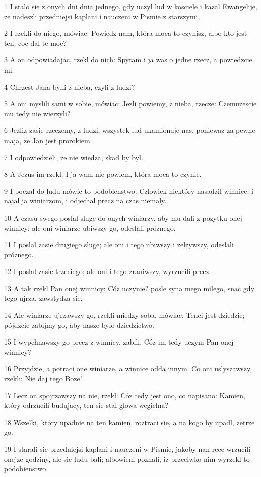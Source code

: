 \par 1 I stalo sie z onych dni dnia jednego, gdy uczyl lud w kosciele i kazal Ewangelije, ze nadeszli przedniejsi kaplani i nauczeni w Pismie z starszymi,
\par 2 I rzekli do niego, mówiac: Powiedz nam, która moca to czynisz, albo kto jest ten, coc dal te moc?
\par 3 A on odpowiadajac, rzekl do nich: Spytam i ja was o jedne rzecz, a powiedzcie mi:
\par 4 Chrzest Jana bylli z nieba, czyli z ludzi?
\par 5 A oni myslili sami w sobie, mówiac: Jezli powiemy, z nieba, rzecze: Czemuzescie mu tedy nie wierzyli?
\par 6 Jezliz zasie rzeczemy, z ludzi, wszystek lud ukamionuje nas, poniewaz za pewne maja, ze Jan jest prorokiem.
\par 7 I odpowiedzieli, ze nie wiedza, skad by byl.
\par 8 A Jezus im rzekl: I ja wam nie powiem, która moca to czynie.
\par 9 I poczal do ludu mówic to podobienstwo: Czlowiek niektóry nasadzil winnice, i najal ja winiarzom, i odjechal precz na czas niemaly.
\par 10 A czasu swego poslal sluge do onych winiarzy, aby mu dali z pozytku onej winnicy; ale oni winiarze ubiwszy go, odeslali próznego.
\par 11 I poslal zasie drugiego sluge; ale oni i tego ubiwszy i zelzywszy, odeslali próznego.
\par 12 I poslal zasie trzeciego; ale oni i tego zraniwszy, wyrzucili precz.
\par 13 A tak rzekl Pan onej winnicy: Cóz uczynie? posle syna mego milego, snac gdy tego ujrza, zawstydza sie.
\par 14 Ale winiarze ujrzawszy go, rzekli miedzy soba, mówiac: Tenci jest dziedzic; pójdzcie zabijmy go, aby nasze bylo dziedzictwo.
\par 15 I wypchnawszy go precz z winnicy, zabili. Cóz im tedy uczyni Pan onej winnicy?
\par 16 Przyjdzie, a potraci one winiarze, a winnice odda innym. Co oni uslyszawszy, rzekli: Nie daj tego Boze!
\par 17 Lecz on spojrzawszy na nie, rzekl: Cóz tedy jest ono, co napisano: Kamien, który odrzucili budujacy, ten sie stal glowa wegielna?
\par 18 Wszelki, który upadnie na ten kamien, roztraci sie, a na kogo by upadl, zetrze go.
\par 19 I starali sie przedniejsi kaplani i nauczeni w Pismie, jakoby nan rece wrzucili onejze godziny, ale sie ludu bali; albowiem poznali, iz przeciwko nim wyrzekl to podobienstwo.
